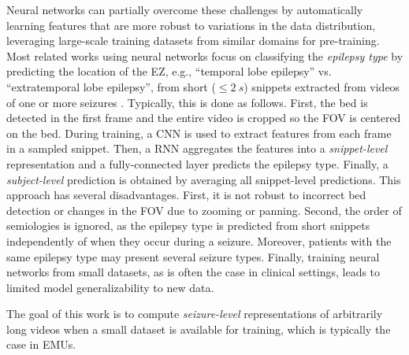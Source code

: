 Neural networks can partially overcome these challenges by automatically learning features that are more robust to variations in the data distribution, leveraging large-scale training datasets from similar domains for pre-training.
Most related works using neural networks focus on classifying the \emph{epilepsy type} by predicting the location of the \ac{EZ}, e.g., ``temporal lobe epilepsy'' vs. ``extratemporal lobe epilepsy'', from short ($\le \SI{2}{s}$) snippets extracted from videos of one or more seizures \cite{ahmedt-aristizabal_deep_2018,ahmedt-aristizabal_hierarchical_2018,ahmedt-aristizabal_deep_2018-1,maia_epileptic_2019,karacsony_deep_2020}.
Typically, this is done as follows.
First, the bed is detected in the first frame and the entire video is cropped so the \ac{FOV} is centered on the bed.
During training, a \ac{CNN} is used to extract features from each frame in a sampled snippet.
Then, a \ac{RNN} aggregates the features into a \emph{snippet-level} representation and a fully-connected layer predicts the epilepsy type.
Finally, a \emph{subject-level} prediction is obtained by averaging all snippet-level predictions.
This approach has several disadvantages.
First, it is not robust to incorrect bed detection or changes in the \ac{FOV} due to zooming or panning.
Second, the order of semiologies is ignored, as the epilepsy type is predicted from short snippets independently of when they occur during a seizure.
Moreover, patients with the same epilepsy type may present several seizure types.
Finally, training neural networks from small datasets, as is often the case in clinical settings, leads to limited model generalizability to new data.

The goal of this work is to compute \emph{seizure-level} representations of arbitrarily long videos when a small dataset is available for training, which is typically the case in \acp{EMU}.

